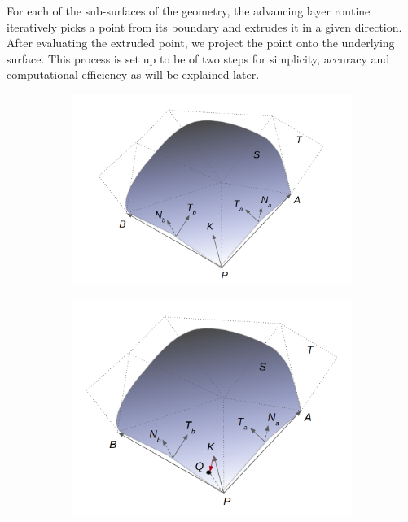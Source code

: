 For each of the sub-surfaces of the geometry, the advancing layer routine iteratively picks a point from its boundary and extrudes it in a given direction. After evaluating the extruded point, we project the point onto the underlying surface. This process is set up to be of two steps for simplicity, accuracy and computational efficiency as will be explained later.

\begin{figure}
\centering
\begin{subfigure}{0.5\textwidth}
  \centering
  \includegraphics[trim={2cm 0 2cm 0},clip,width=\linewidth]{img/m1/pointPlacement.png}
  \caption{}
  \label{fig-pointPlacement1}
\end{subfigure}%
\begin{subfigure}{0.5\textwidth}
  \centering
  \includegraphics[width=\linewidth]{img/m1/pointProjection.png}

\end{subfigure}
\end{figure}
